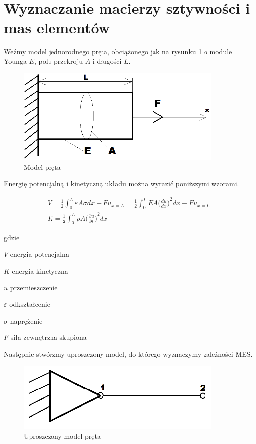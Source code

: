 \section{Wyznaczanie macierzy sztywności i mas elementów}
\label{sec:wyznaczanie_macierzy}

Weźmy model jednorodnego pręta, obciążonego jak na rysunku \ref{fig:pret} o module Younga \( E \), polu przekroju \( A \) i długości \( L \).

\begin{figure}[h]
\centering
\includegraphics[width=10cm]{Zdjecia/3/pret}
\caption{Model pręta}
\label{fig:pret}
\end{figure}

Energię potencjalną i kinetyczną układu można wyrazić poniższymi wzorami.

\begin{gather} \label{eq:energia}
V = \frac{1}{2} \int_0^L \varepsilon A \sigma dx - Fu_{x=L} = \frac{1}{2} \int_0^L EA {\bigg( \frac{du}{dx}\bigg)}^2 dx - Fu_{x=L} \\
K = \frac{1}{2} \int_0^L \rho A {\bigg(\frac{\partial u}{\partial t}\bigg)}^2 dx
\end{gather}

gdzie
\begin{eqwhere}[2cm]
	\item[$V $] energia potencjalna
	\item[$K $] energia kinetyczna
	\item[$u $] przemieszczenie
	\item[$\varepsilon $] odkształcenie
	\item[$\sigma $] naprężenie
	\item[$F $] siła zewnętrzna skupiona
\end{eqwhere}
	
	Następnie stwórzmy uproszczony model, do którego wyznaczymy zależności MES.

\begin{figure}[h]
\centering
\includegraphics[width=10cm]{Zdjecia/3/pret_upr}
\caption{Uproszczony model pręta}
\label{fig:pret_upr}
\end{figure}

